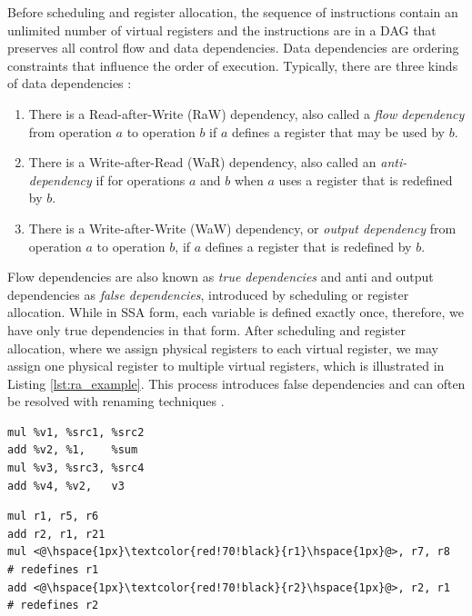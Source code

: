 Before scheduling and register allocation, the sequence of instructions contain an unlimited number of virtual registers and the instructions are in a DAG that preserves all control flow and data dependencies. Data dependencies are ordering constraints that influence the order of execution. Typically, there are three kinds of data dependencies \cite{data_dependece}:
\begin{enumerate}
\item There is a Read-after-Write (RaW) dependency, also called a \emph{flow dependency} from operation $a$ to operation $b$ if $a$ defines a register that may be used by $b$.
\item  There is a Write-after-Read (WaR) dependency, also called an \emph{anti-dependency} if for operations $a$ and $b$ when $a$ uses a register that is redefined by $b$. 
\item There is a Write-after-Write (WaW) dependency, or \emph{output dependency} from operation $a$ to operation $b$, if $a$ defines a register that is redefined by $b$.
\end{enumerate} 

Flow dependencies are also known as \emph{true dependencies} and anti and output dependencies as \emph{false dependencies}, introduced by scheduling or register allocation. While in SSA form, each variable is defined exactly once, therefore, we have only true dependencies in that form. After scheduling and register allocation, where we assign physical registers to each virtual register, we may assign one physical register to multiple virtual registers, which is illustrated in Listing \ref{lst:ra_example}. This process introduces false dependencies and can often be resolved with renaming techniques \cite{tta_codegen,renaming}.

\begin{center}
\hspace{2px}\begin{minipage}[t]{.475\textwidth}
\begin{lstlisting}[frame=tlrb]
mul %v1, %src1, %src2
add %v2, %1,    %sum
mul %v3, %src3, %src4
add %v4, %v2,   v3
\end{lstlisting}
\end{minipage}\hfill
\begin{minipage}[t]{.475\textwidth}
\begin{lstlisting}[frame=tlrb]
mul r1, r5, r6
add r2, r1, r21
mul <@\hspace{1px}\textcolor{red!70!black}{r1}\hspace{1px}@>, r7, r8  # redefines r1
add <@\hspace{1px}\textcolor{red!70!black}{r2}\hspace{1px}@>, r2, r1  # redefines r2
\end{lstlisting}
\end{minipage}
\label{lst:ra_example}
\end{center}

